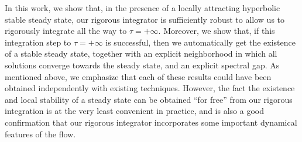 \documentclass[10pt,a4paper]{article}
\theoremstyle{plain}
\newcommand{\1}{\mathbf{1}}
\begin{document}
In this work, we show that, in the presence of a locally attracting hyperbolic stable steady state, our rigorous integrator is sufficiently robust to allow us to rigorously integrate all the way to $\tau=+\infty$. Moreover, we show that, if this integration step to $\tau=+\infty$ is successful, then we automatically get the existence of a stable steady state, together with an explicit neighborhood in which all solutions converge towards the steady state, 
and an explicit spectral gap. As mentioned above, we emphasize that each of these results could have been obtained independently with existing techniques. However, the fact the existence and local stability of a steady state can be obtained ``for free'' from our rigorous integration is at the very least convenient in practice, and is also a good confirmation that our rigorous integrator incorporates some important dynamical features of the flow.
\end{document}
